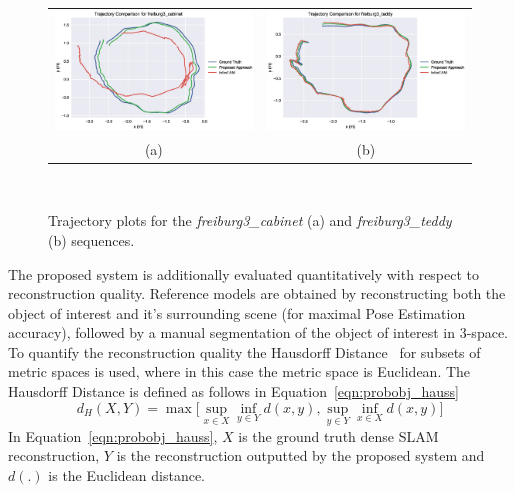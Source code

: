 \begin{figure}[!htbp]
  \centering
  \begin{tabular}{cc}
  \includegraphics[width=.45\linewidth]{figures/object_recon/plots/traj/cab_traj.eps} & 
  \includegraphics[width=.45\linewidth]{figures/object_recon/plots/traj/ted_traj.eps} \\
  (a) & (b)
  \end{tabular}
  \caption[Probabilistic Object Reconstruction Trajectory Plots]
  {Trajectory plots for the \textit{freiburg3\_cabinet} (a) 
  and \textit{\textsf{freiburg3\_teddy}} (b) sequences.}
~\label{figure:probobj_traj}
\end{figure}

The proposed system is additionally evaluated quantitatively with respect to reconstruction 
quality. Reference models are obtained by reconstructing both the object of interest and it's 
surrounding scene (for maximal Pose Estimation accuracy), followed by a manual segmentation of 
the object of interest in 3-space. To quantify the reconstruction quality the Hausdorff 
Distance~\cite{Rote1991} for subsets of metric spaces is used, where in this case the metric 
space is Euclidean. The Hausdorff Distance is defined as follows in Equation~\ref{eqn:probobj_hauss}
\begin{equation}
  \label{eqn:probobj_hauss}
  d_{H}(X, Y) = \max \Bigg[
  \sup_{x \in X} \inf_{y \in Y} d(x, y), \sup_{y \in Y} \inf_{x \in X} d(x, y) 
  \Bigg]
\end{equation}
In Equation~\ref{eqn:probobj_hauss}, \(X\) is the ground truth dense SLAM reconstruction, 
\(Y\) is the reconstruction outputted by the proposed system and \(d(.)\) is the Euclidean 
distance.

